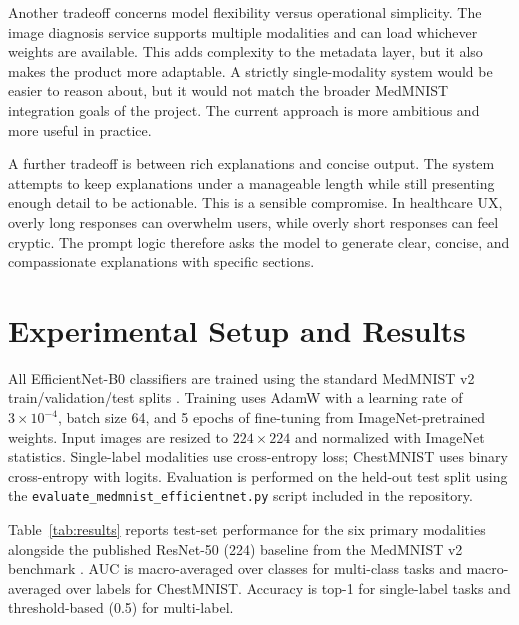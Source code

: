 \documentclass[conference]{IEEEtran}
\begin{document}
Another tradeoff concerns model flexibility versus operational simplicity. The image diagnosis service supports multiple modalities and can load whichever weights are available. This adds complexity to the metadata layer, but it also makes the product more adaptable. A strictly single-modality system would be easier to reason about, but it would not match the broader MedMNIST integration goals of the project. The current approach is more ambitious and more useful in practice.

A further tradeoff is between rich explanations and concise output. The system attempts to keep explanations under a manageable length while still presenting enough detail to be actionable. This is a sensible compromise. In healthcare UX, overly long responses can overwhelm users, while overly short responses can feel cryptic. The prompt logic therefore asks the model to generate clear, concise, and compassionate explanations with specific sections.

\section{Experimental Setup and Results}
All EfficientNet-B0 classifiers are trained using the standard MedMNIST v2 train/validation/test splits \cite{medmnistv2}. Training uses AdamW with a learning rate of $3\times10^{-4}$, batch size 64, and 5 epochs of fine-tuning from ImageNet-pretrained weights. Input images are resized to $224\times224$ and normalized with ImageNet statistics. Single-label modalities use cross-entropy loss; ChestMNIST uses binary cross-entropy with logits. Evaluation is performed on the held-out test split using the \texttt{evaluate\_medmnist\_efficientnet.py} script included in the repository.

Table~\ref{tab:results} reports test-set performance for the six primary modalities alongside the published ResNet-50 (224) baseline from the MedMNIST v2 benchmark \cite{medmnistv2}. AUC is macro-averaged over classes for multi-class tasks and macro-averaged over labels for ChestMNIST. Accuracy is top-1 for single-label tasks and threshold-based (0.5) for multi-label.
\end{document}
